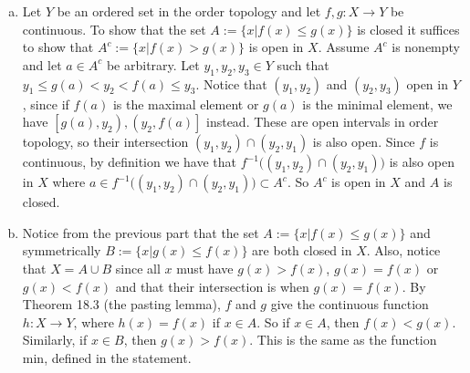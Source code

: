 \documentclass[12pt]{article}
\newenvironment{solution}[1][Solution]
{
	\begin{trivlist} 
		\item[\hskip \labelsep {\itshape #1:}]
	}
	{
	\end{trivlist}
}
\begin{document}
\begin{solution} \hfill
	\begin{enumerate}[(a)]
	\item Let $Y$ be an ordered set in the order topology and let $f, g: X \rightarrow Y$ be continuous. To show that the set $A:= \lbrace{x | f(x) \leq g(x)\rbrace}$ is closed it suffices to show that $A^c :=  \lbrace{x | f(x) > g(x)\rbrace}$ is open in $X$. Assume $A^c$ is nonempty and let $a \in A^c$ be arbitrary. Let $y_1, y_2, y_3 \in Y$ such that $y_1 \leq g(a) < y_2 < f(a) \leq y_3$. Notice that $(y_1, y_2)$ and $(y_2, y_3)$ open in $Y$, since if $f(a)$ is the maximal element or $g(a)$ is the minimal element, we have $\left[g(a), y_2\right), \left(y_2, f(a)\right]$ instead. These are open intervals in order topology, so their intersection $(y_1, y_2) \cap (y_2, y_1)$ is also open. Since $f$ is continuous, by definition we have that $f^{-1}\big((y_1, y_2) \cap (y_2, y_1)\big)$ is also open in $X$ where $a \in f^{-1}\big((y_1, y_2) \cap (y_2, y_1)\big) \subset A^c$. So $A^c$ is open in $X$ and $A$ is closed.  
	\item Notice from the previous part that the set  $A:= \lbrace{x | f(x) \leq g(x)\rbrace}$ and symmetrically $B:= \lbrace{x | g(x) \leq f(x)\rbrace}$ are both closed in $X$. Also, notice that $X = A \cup B$ since all $x$ must have $g(x) > f(x)$, $g(x) = f(x)$ or $g(x) < f(x)$ and that their intersection is when $g(x) = f(x)$. By Theorem 18.3 (the pasting lemma), $f$ and $g$ give the continuous function $h: X \rightarrow Y$, where $h(x) = f(x)$ if $x \in A$. So if $x \in A$, then $f(x) < g(x)$. Similarly, if $x \in B$, then $g(x) > f(x)$. This is the same as the function min, defined in the statement. 
	\end{enumerate}
\end{solution}
\end{document}
